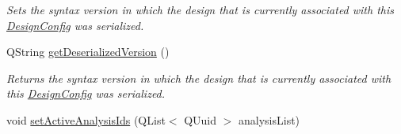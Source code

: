 \begin{DoxyCompactItemize}
\begin{DoxyCompactList}\small\item\em Sets the syntax version in which the design that is currently associated with this \hyperlink{class_picto_1_1_design_config}{Design\-Config} was serialized. \end{DoxyCompactList}\item 
\hypertarget{class_picto_1_1_design_config_ae64af0f48e79e6b212c7a9481e71d9a5}{Q\-String \hyperlink{class_picto_1_1_design_config_ae64af0f48e79e6b212c7a9481e71d9a5}{get\-Deserialized\-Version} ()}\label{class_picto_1_1_design_config_ae64af0f48e79e6b212c7a9481e71d9a5}

\begin{DoxyCompactList}\small\item\em Returns the syntax version in which the design that is currently associated with this \hyperlink{class_picto_1_1_design_config}{Design\-Config} was serialized. \end{DoxyCompactList}\item 
\hypertarget{class_picto_1_1_design_config_a0107c84cfb5d53469b871eabd0429991}{void \hyperlink{class_picto_1_1_design_config_a0107c84cfb5d53469b871eabd0429991}{set\-Active\-Analysis\-Ids} (Q\-List$<$ Q\-Uuid $>$ analysis\-List)}\label{class_picto_1_1_design_config_a0107c84cfb5d53469b871eabd0429991}


\end{DoxyCompactItemize}
